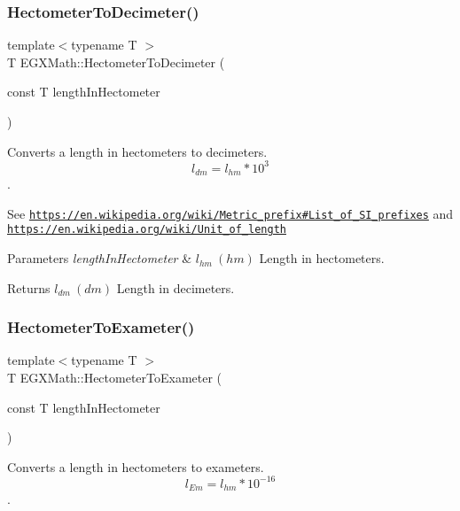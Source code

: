 \subsubsection{\texorpdfstring{Hectometer\+To\+Decimeter()}{HectometerToDecimeter()}}
{\footnotesize\ttfamily template$<$typename T $>$ \\
T E\+G\+X\+Math\+::\+Hectometer\+To\+Decimeter (\begin{DoxyParamCaption}\item[{const T}]{length\+In\+Hectometer }\end{DoxyParamCaption})}



Converts a length in hectometers to decimeters. \[ l_{dm}=l_{hm} * 10^{3} \]. 

See \href{https://en.wikipedia.org/wiki/Metric_prefix#List_of_SI_prefixes}{\tt https\+://en.\+wikipedia.\+org/wiki/\+Metric\+\_\+prefix\#\+List\+\_\+of\+\_\+\+S\+I\+\_\+prefixes} and \href{https://en.wikipedia.org/wiki/Unit_of_length}{\tt https\+://en.\+wikipedia.\+org/wiki/\+Unit\+\_\+of\+\_\+length} 
\begin{DoxyParams}{Parameters}
{\em length\+In\+Hectometer} & $ l_{hm}\ (hm)$ Length in hectometers. \\
\hline
\end{DoxyParams}
\begin{DoxyReturn}{Returns}
$ l_{dm}\ (dm)$ Length in decimeters. 
\end{DoxyReturn}
\mbox{\label{group___e_g_x_math-_conversions-_length_conversions-_hectometer-_s_i_ga613414d30b834e129c315c144e7e01f7}} 
\subsubsection{\texorpdfstring{Hectometer\+To\+Exameter()}{HectometerToExameter()}}
{\footnotesize\ttfamily template$<$typename T $>$ \\
T E\+G\+X\+Math\+::\+Hectometer\+To\+Exameter (\begin{DoxyParamCaption}\item[{const T}]{length\+In\+Hectometer }\end{DoxyParamCaption})}



Converts a length in hectometers to exameters. \[ l_{Em}=l_{hm} * 10^{-16} \]. 

